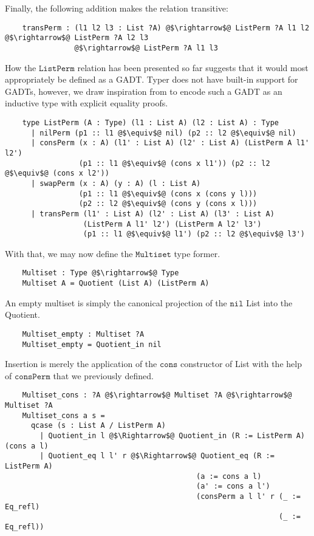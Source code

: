 \documentclass[12pt,twoside,maitrise]{dms}
\theoremstyle{definition}
\numberwithin{equation}{section}
\numberwithin{table}{chapter}
\numberwithin{figure}{chapter}
\newcommand\fn[1] {\texttt{#1}}
\begin{document}
Finally, the following addition makes the relation transitive:

\begin{verbatim}
    transPerm : (l1 l2 l3 : List ?A) @$\rightarrow$@ ListPerm ?A l1 l2 @$\rightarrow$@ ListPerm ?A l2 l3
                @$\rightarrow$@ ListPerm ?A l1 l3
\end{verbatim}

How the $\fn{ListPerm}$ relation has been presented so far suggests that it
would most appropriately be defined as a GADT\@. Typer does not have built-in
support for GADTs, however, we draw inspiration from\cite{sulzmann2007systemfeq}
to encode such a GADT as an inductive type with explicit equality proofs.

\begin{verbatim}
    type ListPerm (A : Type) (l1 : List A) (l2 : List A) : Type
      | nilPerm (p1 :: l1 @$\equiv$@ nil) (p2 :: l2 @$\equiv$@ nil)
      | consPerm (x : A) (l1' : List A) (l2' : List A) (ListPerm A l1' l2')
                 (p1 :: l1 @$\equiv$@ (cons x l1')) (p2 :: l2 @$\equiv$@ (cons x l2'))
      | swapPerm (x : A) (y : A) (l : List A)
                 (p1 :: l1 @$\equiv$@ (cons x (cons y l)))
                 (p2 :: l2 @$\equiv$@ (cons y (cons x l)))
      | transPerm (l1' : List A) (l2' : List A) (l3' : List A)
                  (ListPerm A l1' l2') (ListPerm A l2' l3')
                  (p1 :: l1 @$\equiv$@ l1') (p2 :: l2 @$\equiv$@ l3')
\end{verbatim}

With that, we may now define the $\fn{Multiset}$ type former.

\begin{verbatim}
    Multiset : Type @$\rightarrow$@ Type
    Multiset A = Quotient (List A) (ListPerm A)
\end{verbatim}

An empty multiset is simply the canonical projection of the $\fn{nil}$ List into
the Quotient.

\begin{verbatim}
    Multiset_empty : Multiset ?A
    Multiset_empty = Quotient_in nil
\end{verbatim}

Insertion is merely the application of the $\fn{cons}$ constructor of List with the help
of $\fn{consPerm}$ that we previously defined.

\begin{verbatim}
    Multiset_cons : ?A @$\rightarrow$@ Multiset ?A @$\rightarrow$@ Multiset ?A
    Multiset_cons a s =
      qcase (s : List A / ListPerm A)
        | Quotient_in l @$\Rightarrow$@ Quotient_in (R := ListPerm A) (cons a l)
        | Quotient_eq l l' r @$\Rightarrow$@ Quotient_eq (R := ListPerm A)
                                            (a := cons a l)
                                            (a' := cons a l')
                                            (consPerm a l l' r (_ := Eq_refl)
                                                               (_ := Eq_refl))
\end{verbatim}
\end{document}
